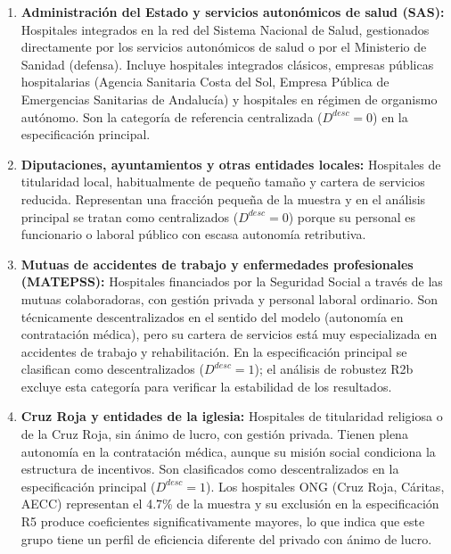 \documentclass[12pt, a4paper, twoside, openright]{book}
\theoremstyle{plain}
\theoremstyle{definition}
\theoremstyle{remark}
\begin{document}
\begin{enumerate}[label=(\roman*)]
  \item \textbf{Administración del Estado y servicios autonómicos de salud (SAS):} Hospitales integrados en la red del Sistema Nacional de Salud, gestionados directamente por los servicios autonómicos de salud o por el Ministerio de Sanidad (defensa). Incluye hospitales integrados clásicos, empresas públicas hospitalarias (Agencia Sanitaria Costa del Sol, Empresa Pública de Emergencias Sanitarias de Andalucía) y hospitales en régimen de organismo autónomo. Son la categoría de referencia centralizada ($D^{desc}=0$) en la especificación principal.

  \item \textbf{Diputaciones, ayuntamientos y otras entidades locales:} Hospitales de titularidad local, habitualmente de pequeño tamaño y cartera de servicios reducida. Representan una fracción pequeña de la muestra y en el análisis principal se tratan como centralizados ($D^{desc}=0$) porque su personal es funcionario o laboral público con escasa autonomía retributiva.

  \item \textbf{Mutuas de accidentes de trabajo y enfermedades profesionales (MATEPSS):} Hospitales financiados por la Seguridad Social a través de las mutuas colaboradoras, con gestión privada y personal laboral ordinario. Son técnicamente descentralizados en el sentido del modelo (autonomía en contratación médica), pero su cartera de servicios está muy especializada en accidentes de trabajo y rehabilitación. En la especificación principal se clasifican como descentralizados ($D^{desc}=1$); el análisis de robustez R2b excluye esta categoría para verificar la estabilidad de los resultados.

  \item \textbf{Cruz Roja y entidades de la iglesia:} Hospitales de titularidad religiosa o de la Cruz Roja, sin ánimo de lucro, con gestión privada. Tienen plena autonomía en la contratación médica, aunque su misión social condiciona la estructura de incentivos. Son clasificados como descentralizados en la especificación principal ($D^{desc}=1$). Los hospitales ONG (Cruz Roja, Cáritas, AECC) representan el 4.7\% de la muestra y su exclusión en la especificación R5 produce coeficientes significativamente mayores, lo que indica que este grupo tiene un perfil de eficiencia diferente del privado con ánimo de lucro.


\end{enumerate}
\end{document}
